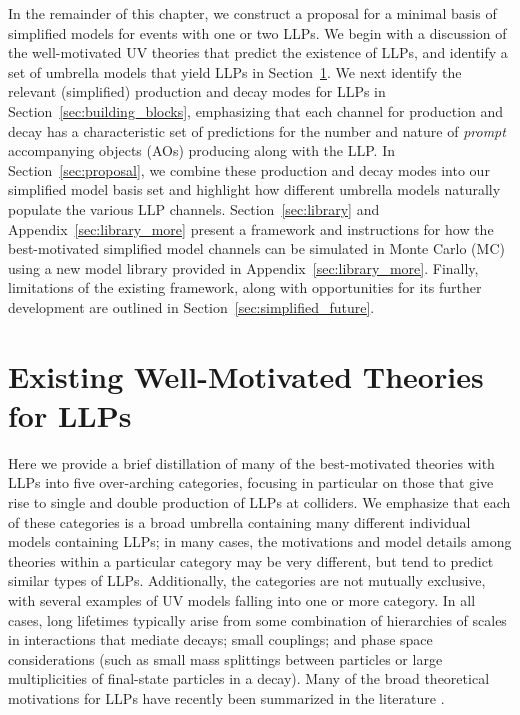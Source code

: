 In the remainder of this chapter, we construct a proposal for a minimal basis of simplified models for events with one or two LLPs.
We begin with a discussion of the well-motivated UV theories that predict the existence of LLPs, and identify a set of umbrella models that yield LLPs in Section~\ref{sec:motivated_theories}.
We next identify the relevant (simplified) production and decay modes for LLPs in Section~\ref{sec:building_blocks}, emphasizing that each channel for production and decay has a characteristic set of predictions for the number and nature of {\em prompt} accompanying objects (AOs) producing along with the LLP.
In Section~\ref{sec:proposal}, we combine these production and decay modes into our simplified model basis set and highlight how different umbrella models naturally populate the various LLP channels.
Section~\ref{sec:library} and Appendix~\ref{sec:library_more} present a framework and instructions for how the best-motivated simplified model channels can be simulated in Monte Carlo (MC) using a new model library provided in Appendix~\ref{sec:library_more}.
Finally, limitations of the existing framework, along with opportunities for its further development are outlined in Section~\ref{sec:simplified_future}.

\section{Existing Well-Motivated Theories for LLPs}\label{sec:motivated_theories}

Here we provide a brief distillation of many of the best-motivated theories with LLPs into five over-arching categories, focusing in particular on those that give rise to single and double production of LLPs at colliders.
We emphasize that each of these categories is a broad umbrella containing many different individual models containing LLPs; in many cases, the motivations and model details among theories within a particular category may be very different, but tend to predict similar types of LLPs. Additionally, the categories are not mutually exclusive, with several examples of UV models falling into one or more category.
In all cases, long lifetimes typically arise from some combination of hierarchies of scales in interactions that mediate decays; small couplings; and phase space considerations (such as small mass splittings between particles or large multiplicities of final-state particles in a decay). Many of the broad theoretical motivations for LLPs have recently been summarized in the literature \cite{Curtin:2018mvb}.

